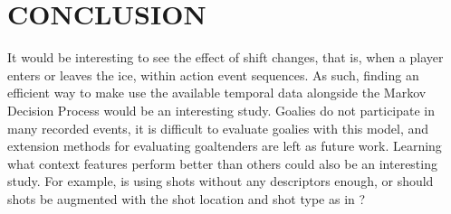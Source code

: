 \documentclass[]{article}
\begin{document}
\section{CONCLUSION}

It would be interesting to see the effect of shift changes, that is, when a player enters or leaves the ice, within action event sequences. As such, finding an efficient way to make use the available temporal data alongside the Markov Decision Process would be an interesting study. Goalies do not participate in many recorded events, it is difficult to evaluate goalies with this model, and extension methods for evaluating goaltenders are left as future work. Learning what context features perform better than others could also be an interesting study. For example, is using shots without any descriptors enough, or should shots be augmented with the shot location and shot type as in \citep{Krzywicki2005}?



%
%
%
%
%
%
%
\end{document}
